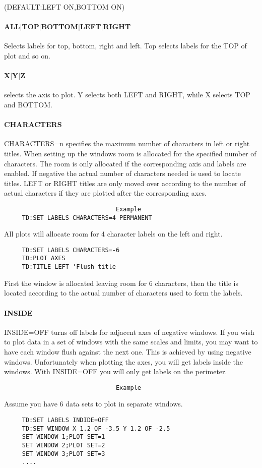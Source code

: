 (DEFAULT:LEFT ON,BOTTOM ON) 
\paragraph{ALL$|$TOP$|$BOTTOM$|$LEFT$|$RIGHT}
Selects  labels  for top, bottom, right and left.  Top selects labels
for the TOP of plot and so on.  
\paragraph{X$|$Y$|$Z}
selects  the  axis  to  plot.  Y selects both LEFT and RIGHT, while X
selects TOP and BOTTOM.  
\paragraph{CHARACTERS}
CHARACTERS=n  specifies  the  maximum number of characters in left or
right titles.  When setting up the windows room is allocated for  the
specified  number  of  characters.  The room is only allocated if the
corresponding axis and labels are enabled.  If  negative  the  actual
number  of characters needed is used to locate titles.  LEFT or RIGHT
titles are  only  moved  over  according  to  the  number  of  actual
characters if they are plotted after the corresponding axes.  

\begin{verbatim}
                               Example
     TD:SET LABELS CHARACTERS=4 PERMANENT 
\end{verbatim}
All  plots  will allocate room for 4 character labels on the left and
right.  
\begin{verbatim}
     TD:SET LABELS CHARACTERS=-6 
     TD:PLOT AXES 
     TD:TITLE LEFT 'Flush title 
\end{verbatim}
First the window is allocated leaving room for 6 characters, then the
title is located according to the actual number of characters used to
form the labels.  
\paragraph{INSIDE}
INSIDE=OFF  turns  off  labels for adjacent axes of negative windows.
If you wish to plot data in a set of windows with the same scales and
limits,  you may want to have each window flush against the next one.
This is achieved  by  using  negative  windows.   Unfortunately  when
plotting  the  axes,  you  will  get labels inside the windows.  With
INSIDE=OFF you will only get labels on the perimeter.  

\begin{verbatim}
                               Example
\end{verbatim}
Assume you have 6 data sets to plot in separate windows.  
\begin{verbatim}
     TD:SET LABELS INDIDE=OFF 
     TD:SET WINDOW X 1.2 OF -3.5 Y 1.2 OF -2.5 
     SET WINDOW 1;PLOT SET=1 
     SET WINDOW 2;PLOT SET=2 
     SET WINDOW 3;PLOT SET=3 
     ....  
\end{verbatim}
